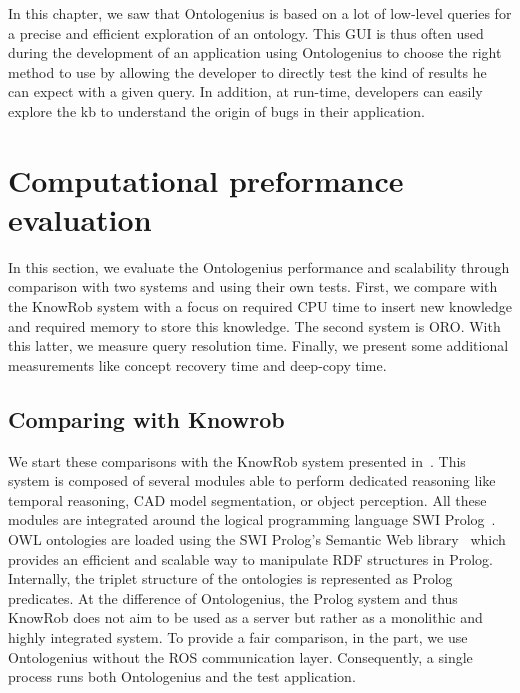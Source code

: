In this chapter, we saw that Ontologenius is based on a lot of low-level queries for a precise and efficient exploration of an ontology. This GUI is thus often used during the development of an application using Ontologenius to choose the right method to use by allowing the developer to directly test the kind of results he can expect with a given query. In addition, at run-time, developers can easily explore the \acrshort{kb} to understand the origin of bugs in their application.

\section{Computational preformance evaluation}

In this section, we evaluate the Ontologenius performance and scalability through comparison with two systems and using their own tests. First, we compare with the KnowRob system with a focus on required CPU time to insert new knowledge and required memory to store this knowledge. The second system is ORO. With this latter, we measure query resolution time. Finally, we present some additional measurements like concept recovery time and deep-copy time.

\subsection{Comparing with Knowrob}

We start these comparisons with the KnowRob system presented in~\cite{tenorth_2013_knowrob}. This system is composed of several modules able to perform dedicated reasoning like temporal reasoning, CAD model segmentation, or object perception. All these modules are integrated around the logical programming language SWI Prolog~\cite{wielemaker_2012_swi}. OWL ontologies are loaded using the SWI Prolog’s Semantic Web library~\cite{wielemaker_2003_prolog} which provides an efficient and scalable way to manipulate RDF structures in Prolog. Internally, the triplet structure of the ontologies is represented as Prolog predicates. At the difference of Ontologenius, the Prolog system and thus KnowRob does not aim to be used as a server but rather as a monolithic and highly integrated system. To provide a fair comparison, in the part, we use Ontologenius without the ROS communication layer. Consequently, a single process runs both Ontologenius and the test application.

